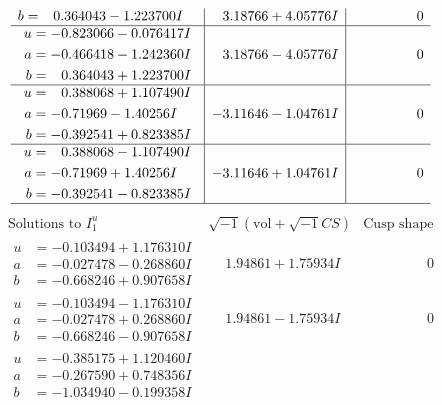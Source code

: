 \documentclass[1p]{elsarticle_modified}
\theoremstyle{definition}
\newcommand{\I}{\sqrt{-1}}
\begin{document}
$$\begin{array}{c|c|c}
\begin{aligned}
b &= \phantom{-}0.364043 - 1.223700 I\end{aligned}
 & \phantom{-}3.18766 + 4.05776 I & \phantom{-0.000000 } 0 \\ \hline\begin{aligned}
u &= -0.823066 - 0.076417 I \\
a &= -0.466418 - 1.242360 I \\
b &= \phantom{-}0.364043 + 1.223700 I\end{aligned}
 & \phantom{-}3.18766 - 4.05776 I & \phantom{-0.000000 } 0 \\ \hline\begin{aligned}
u &= \phantom{-}0.388068 + 1.107490 I \\
a &= -0.71969 - 1.40256 I \\
b &= -0.392541 + 0.823385 I\end{aligned}
 & -3.11646 - 1.04761 I & \phantom{-0.000000 } 0 \\ \hline\begin{aligned}
u &= \phantom{-}0.388068 - 1.107490 I \\
a &= -0.71969 + 1.40256 I \\
b &= -0.392541 - 0.823385 I\end{aligned}
 & -3.11646 + 1.04761 I & \phantom{-0.000000 } 0\\
 \hline 
 \end{array}$$\newpage$$\begin{array}{c|c|c}  
\text{Solutions to }I^u_{1}& \I (\text{vol} + \sqrt{-1}CS) & \text{Cusp shape}\\
 \hline 
\begin{aligned}
u &= -0.103494 + 1.176310 I \\
a &= -0.027478 - 0.268860 I \\
b &= -0.668246 + 0.907658 I\end{aligned}
 & \phantom{-}1.94861 + 1.75934 I & \phantom{-0.000000 } 0 \\ \hline\begin{aligned}
u &= -0.103494 - 1.176310 I \\
a &= -0.027478 + 0.268860 I \\
b &= -0.668246 - 0.907658 I\end{aligned}
 & \phantom{-}1.94861 - 1.75934 I & \phantom{-0.000000 } 0 \\ \hline\begin{aligned}
u &= -0.385175 + 1.120460 I \\
a &= -0.267590 + 0.748356 I \\
b &= -1.034940 - 0.199358 I\end{aligned}

\end{array}$$
\end{document}
